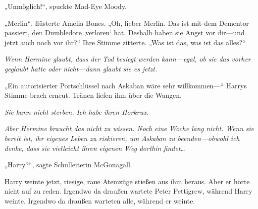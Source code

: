 „Unmöglich!“, spuckte Mad-Eye Moody.

„Merlin“, flüsterte Amelia Bones. „Oh, lieber Merlin. Das ist mit dem Dementor passiert, den Dumbledore ‚verloren‘ hat. Deshalb haben sie Angst vor dir—und jetzt auch noch vor ihr?“
Ihre Stimme zitterte.
„Was ist das, was ist das alles?“

\emph{Wenn Hermine glaubt, dass der Tod besiegt werden kann—egal, ob sie das vorher geglaubt hatte oder nicht—dann glaubt sie es jetzt.
}

„Ein autorisierter Portschlüssel nach Askaban wäre sehr willkommen—“
Harrys Stimme brach erneut.
Tränen liefen ihm über die Wangen.

\emph{Sie kann nicht sterben. Ich habe ihren Horkrux.}



\emph{Aber Hermine braucht das nicht zu wissen. Noch eine Woche lang nicht. Wenn sie bereit ist, ihr eigenes Leben zu riskieren, um Askaban zu beenden—obwohl ich denke, dass sie vielleicht ihren eigenen Weg dorthin findet…}

„Harry?“, sagte Schulleiterin McGonagall.

Harry weinte jetzt, riesige, raue Atemzüge stießen aus ihm heraus. Aber er hörte nicht auf zu reden.
Irgendwo da draußen wartete Peter Pettigrew, während Harry weinte.
Irgendwo da draußen warteten alle, während er weinte.

